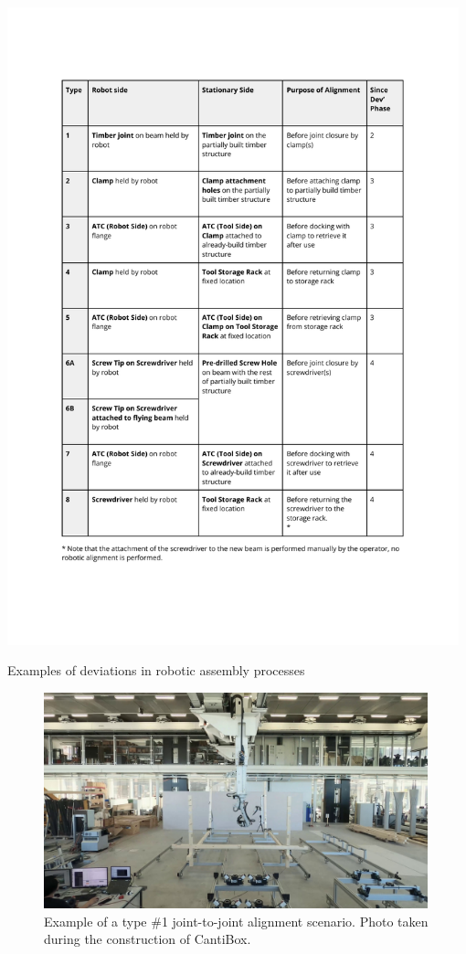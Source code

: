\begin{table}[h!]
    \includegraphics[page=2, trim=25.4mm 135mm 25.4mm 33mm, clip, width=0.98\textwidth]{tables/Tables in Chapter 9 to 11.pdf}
    \caption{Examples of deviations in robotic assembly processes}
    \label{table:deviations_examples}
\end{table}

\FloatBarrier
\clearpage

\begin{figure}[h]
    \centering
    \includegraphics[width=0.99\textwidth]{images/09/Type one alignment scenario.jpg}
    \caption{Example of a type \#1 joint-to-joint alignment scenario. Photo taken during the construction of CantiBox.}
    \label{fig:type_one_alignment_example2}
\end{figure}

